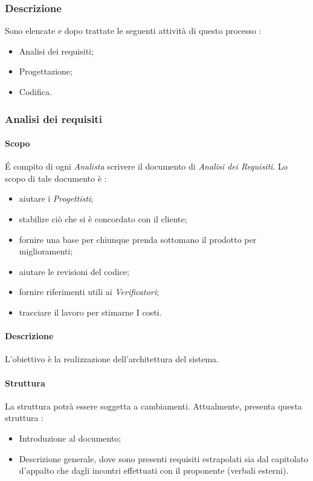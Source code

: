 \subsubsection{Descrizione}
Sono elencate e dopo trattate le seguenti attività di questo processo :
\begin{itemize}
  \item Analisi dei requisiti;
  \item Progettazione;
  \item Codifica.
\end{itemize}
\subsubsection{Analisi dei requisiti}
\paragraph{Scopo}
\'E compito di ogni \textit{Analista} scrivere il documento di \textit{Analisi dei Requisiti}. Lo scopo di tale documento è :
\begin{itemize}
  \item aiutare i \textit{Progettisti};
  \item stabilire ciò che si è concordato con il cliente;
  \item fornire una base per chiunque prenda sottomano il prodotto per miglioramenti;
  \item aiutare le revisioni del codice;
  \item fornire riferimenti utili ai \textit{Verificatori};
  \item tracciare il lavoro per stimarne I costi.
\end{itemize}

\paragraph{Descrizione}
L’obiettivo è la realizzazione dell’architettura del sistema.

\paragraph{Struttura}
La struttura potrà essere soggetta a  cambiamenti.
Attualmente, \AdR presenta questa struttura :
\begin{itemize}
  \item Introduzione al documento;
  \item Descrizione generale, dove sono presenti requisiti estrapolati sia dal capitolato d’appalto che dagli incontri effettuati con il proponente (verbali esterni).
\end{itemize}

